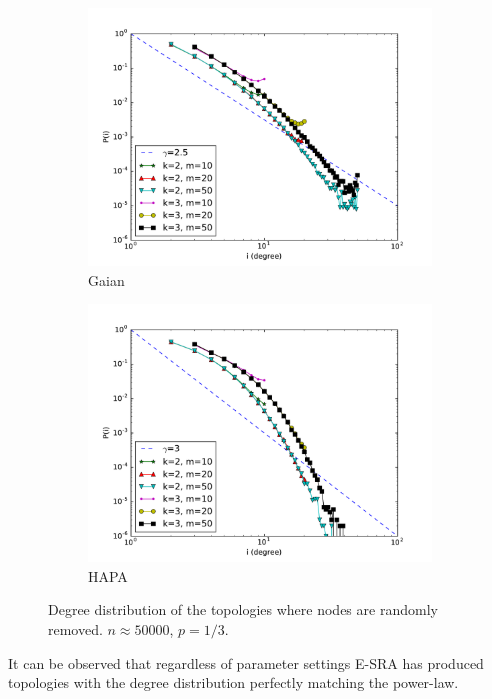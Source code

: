 \begin{figure}[!t]
\begin{subfigure}{.45\textwidth} 
\centering
\includegraphics[width=.99\linewidth]{img/chap2/gaian.pdf}
\caption{Gaian}\label{fig:gaian}
\end{subfigure} 
\begin{subfigure}{.45\textwidth}
\centering
\includegraphics[width=.99\linewidth]{img/chap2/hapa.pdf}
\caption{HAPA}\label{fig:hapa}
\end{subfigure}  

\caption{Degree distribution of the topologies where nodes are randomly removed. $n \approx 50000$, $p=1/3$.}
\label{fig:fig_sim_random}
\end{figure}

It can be observed that regardless of parameter settings E-SRA has produced topologies with the degree distribution perfectly matching the power-law. 

